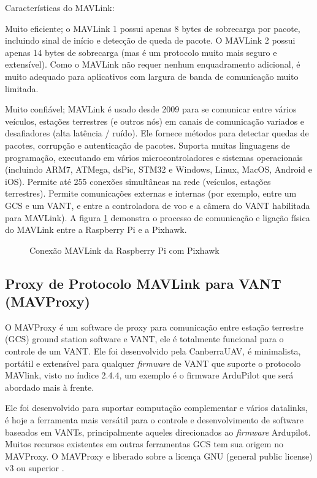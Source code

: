 Características do MAVLink:

Muito eficiente; o MAVLink 1 possui apenas 8 bytes de sobrecarga por pacote, incluindo sinal de início e detecção de queda de pacote. O MAVLink 2 possui apenas 14 bytes de sobrecarga (mas é um protocolo muito mais seguro e extensível). Como o MAVLink não requer nenhum enquadramento adicional, é muito adequado para aplicativos com largura de banda de comunicação muito limitada.

Muito confiável;  MAVLink é usado desde 2009 para se comunicar entre vários veículos, estações terrestres (e outros nós) em canais de comunicação variados e desafiadores (alta latência / ruído). Ele fornece métodos para detectar quedas de pacotes, corrupção e autenticação de pacotes.
Suporta muitas linguagens de programação, executando em vários microcontroladores e sistemas operacionais (incluindo ARM7, ATMega, dsPic, STM32 e Windows, Linux, MacOS, Android e iOS).
Permite até 255 conexões simultâneas na rede (veículos, estações terrestres).
Permite comunicações externas e internas (por exemplo, entre um GCS e um VANT, e entre a controladora de voo e a câmera do VANT habilitada para MAVLink). A figura \ref{fig:mavlink} demonstra o processo de comunicação e ligação física do MAVLink entre a Raspberry Pi e a Pixhawk.

\begin{figure}[H]
	\centering
	\caption{Conexão MAVLink da Raspberry Pi com Pixhawk}
	\fontsize{9pt}{12pt}\selectfont
	\color{black}
	\def\svgwidth{15cm}
	
	\label{fig:mavlink}
\end{figure}

\subsection{Proxy de Protocolo MAVLink para VANT (MAVProxy)}
O MAVProxy é um software de proxy para comunicação entre estação terrestre (GCS) ground station software e VANT, ele é totalmente funcional para o controle de um VANT. Ele foi desenvolvido pela CanberraUAV, é minimalista, portátil e extensível para qualquer \textit{firmware} de VANT que suporte o protocolo MAVlink, visto no índice 2.4.4, um exemplo é o firmware ArduPilot que será abordado mais à frente.

Ele foi desenvolvido para suportar computação complementar e vários datalinks, é hoje a ferramenta mais versátil para o controle e desenvolvimento de software baseados em VANTs, principalmente aqueles direcionados ao \textit{firmware} Ardupilot. Muitos recursos existentes em outras ferramentas GCS tem sua origem no MAVProxy. O MAVProxy e liberado sobre a licença GNU (general public license) v3 ou superior \cite{vintecinco}.

